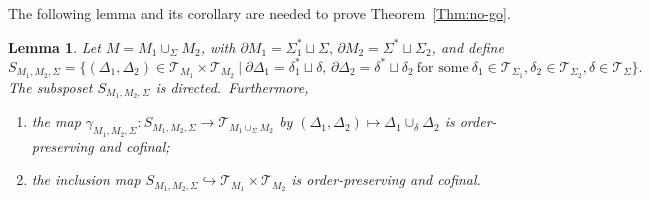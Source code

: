 \documentclass[11pt]{article}
\newcommand{\del}{\partial}
\newtheorem{lemma}[proposition]{Lemma}
\theoremstyle{definition}
\numberwithin{equation}{section}
\begin{document}
\noindent
The following lemma and its corollary are needed to prove Theorem~\ref{Thm:no-go}.
\noindent
\begin{lemma}
    \label{lem:cutsubnet}
    Let $M=M_1\cup_{\Sigma}M_2$, with $\partial M_1=\Sigma^*_1\sqcup\Sigma,\,\del M_2=\Sigma^*\sqcup\Sigma_2$, and define
    $$
    S_{M_1,M_2,\Sigma}=\{(\Delta_1,\Delta_2)\in\mathcal{T}_{M_1}\times\mathcal{T}_{M_2}\ |\ \partial\Delta_1=\delta_1^*\sqcup\delta,\,\partial\Delta_2=\delta^*\sqcup\delta_2\  \text{for some}\ \delta_1\in\mathcal{T}_{\Sigma_1},\delta_2\in\mathcal{T}_{\Sigma_2},\delta\in\mathcal{T}_{\Sigma}\}.
    $$
    The subsposet $S_{M_1,M_2,\Sigma}$ is directed.~Furthermore,
    \begin{enumerate}
        \item the map $\gamma_{M_1,M_2,\Sigma}:S_{M_1,M_2,\Sigma}\to\mathcal{T}_{M_1\cup_{\Sigma}M_2}$ by $(\Delta_1,\Delta_2)\mapsto\Delta_1\cup_{\delta}\Delta_2$ is order-preserving and cofinal;
        \item the inclusion map $S_{M_1,M_2,\Sigma}\hookrightarrow\mathcal{T}_{M_1}\times\mathcal{T}_{M_2}$ is order-preserving and cofinal.
    \end{enumerate}
\end{lemma}
\end{document}
